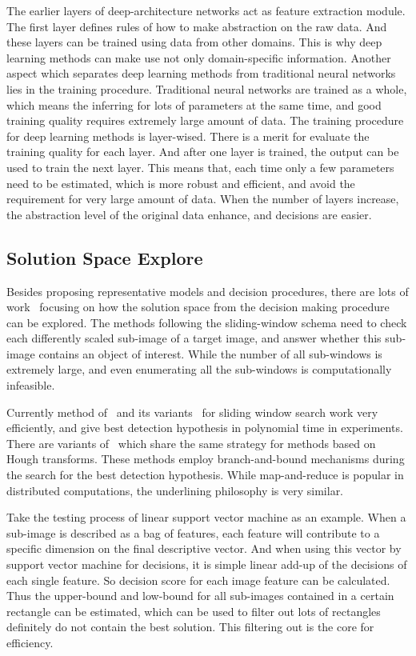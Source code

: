 The earlier layers of deep-architecture networks act as feature extraction module. The first layer defines rules of how to make abstraction on the raw data. And these layers can be trained using  data from other domains. This is why deep learning methods can make use not only domain-specific information. Another aspect which separates deep learning methods from traditional neural networks lies in the training procedure. Traditional neural networks are trained as a whole, which means the inferring for lots of parameters at the same time, and good training quality  requires extremely large amount of data. The training procedure for deep learning methods is layer-wised. There is a merit for evaluate the training quality for each layer. And after one layer is trained, the output can be used to train the next layer. This means that, each time only a few parameters need to be estimated, which is more robust and efficient, and avoid the requirement for very large amount of data. When the number of layers increase, the abstraction level of the original data enhance, and decisions are easier.


\subsection{Solution Space Explore}
Besides proposing representative models and decision procedures, there are lots of work~\citep{408,spm,ciod} focusing on how the solution space from the decision making procedure can be explored. The methods following the sliding-window schema need to check each differently scaled sub-image of a target image, and answer whether this sub-image contains an object of interest. While the number of all sub-windows is extremely large, and even enumerating all the sub-windows is computationally infeasible.

Currently method of~\citep{ij15} and its variants~\citep{ac1} for sliding window search work very efficiently, and give best detection hypothesis in polynomial time in experiments. There are variants of~\citep{ac27} which share the same strategy for methods based on Hough transforms. These methods employ branch-and-bound mechanisms during the search for the best detection hypothesis. While map-and-reduce is popular in distributed computations, the underlining philosophy is very similar.

Take the testing process of linear support vector machine as an example. When a sub-image is described as a bag of features, each feature will contribute to a specific dimension on the final descriptive vector.
And when using this vector by support vector machine for decisions, it is simple linear add-up of the decisions of each single feature. So decision score for each image feature can be calculated. Thus the upper-bound and low-bound for all sub-images contained in a certain rectangle can be estimated, which can be used to filter out lots of rectangles definitely do not contain the best solution. This filtering out is the core for efficiency.

